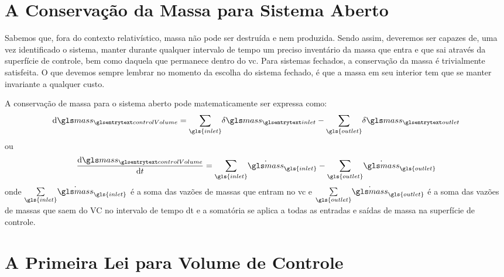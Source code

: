     \section{A Conservação da Massa para Sistema Aberto}

    Sabemos que, fora do contexto relativístico, massa não pode ser destruída e
    nem produzida. Sendo assim, deveremos ser capazes de, uma vez identificado
    o sistema, manter durante qualquer intervalo de tempo  um
    preciso inventário da massa que entra e que sai através da superfície de
    controle, bem como daquela que permanece dentro do \gls{vc}. Para sistemas
    fechados, a conservação da massa é trivialmente satisfeita. O que devemos
    sempre lembrar no momento da escolha do sistema fechado, é que a massa em
    seu interior tem que se manter invariante a qualquer custo.

    A conservação de massa para o sistema aberto pode matematicamente ser
    expressa como:
    \begin{equation} \label{eq:2.12}
        \diff{\gsub{mass}{controlVolume}}
        =
        \underset{\gls{inlet}}{\sum }{
            \idiff{\gsub{mass}{inlet}}
        }
        -
        \underset{\gls{outlet}}{\sum }{
            \idiff{\gsub{mass}{outlet}}
        }
    \end{equation}
    ou
    \begin{equation} \label{eq:2.13}
        \DDt{\gsub{mass}{controlVolume}}
        =
        \underset{\gls{inlet}}{\sum }{
            \transferRate{mass}_{\gls{inlet}}
        }
        -
        \underset{\gls{outlet}}{\sum }{
            \transferRate{mass}_{\gls{outlet}}
        }
    \end{equation}
    onde $\underset{\gls{inlet}}{\sum }{\transferRate{mass}_{\gls{inlet}}}$  é
    a soma das vazões de massas que entram no \gls{vc} e
    $\underset{\gls{outlet}}{\sum }{\transferRate{mass}_{\gls{outlet}}}$ é a
    soma das vazões de massas que saem do VC no intervalo de tempo dt e a
    somatória se aplica a todas as entradas e saídas de massa na superfície de
    controle.


    \section{A Primeira Lei para Volume de Controle}

